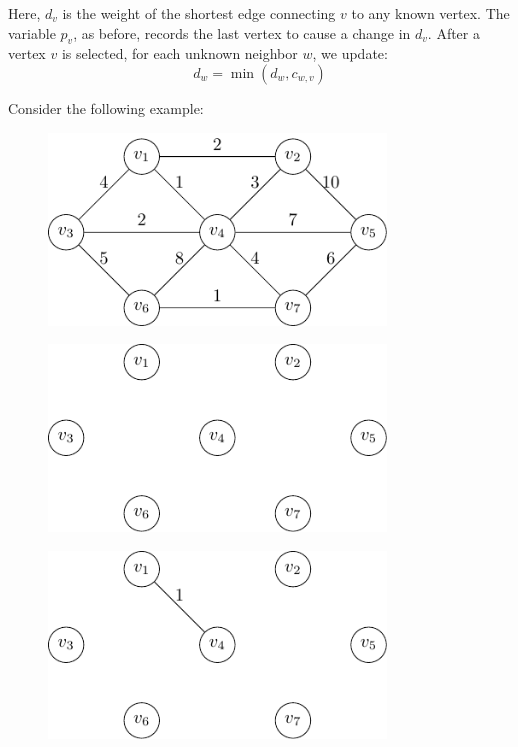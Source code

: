 Here, \(d_v\) is the weight of the shortest edge connecting \(v\) to any known vertex. The variable \(p_v\), as before, records the last vertex to cause a change in \(d_v\). After a vertex \(v\) is selected, for each unknown neighbor \(w\), we update:
\[
d_w = \min(d_w, c_{w,v})
\]

Consider the following example:

\begin{minipage}{0.25\textwidth}
\begin{figure}[H]
  \centering
  \includegraphics[width=0.8\textwidth]{Figure/min_span.pdf}
\end{figure}
\end{minipage}
\begin{minipage}{0.25\textwidth}
\begin{figure}[H]
  \centering
  \includegraphics[width=0.8\textwidth]{Figure/prim_algo_d1.pdf}
\end{figure}
\end{minipage}
\begin{minipage}{0.25\textwidth}
\begin{figure}[H]
  \centering
  \includegraphics[width=0.8\textwidth]{Figure/prim_algo_d2.pdf}
\end{figure}
\end{minipage}
